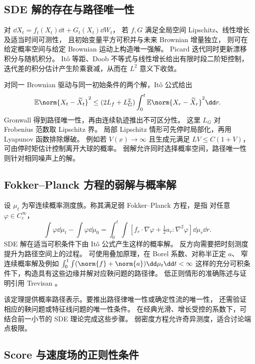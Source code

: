 \subsection{SDE 解的存在与路径唯一性}

对 \(\dd X_t=f_t(X_t)\dd t+G_t(X_t)\dd W_t\)，
若 \(f,G\) 满足全局空间 Lipschitz、线性增长及适当时间可测性，
且初始变量平方可积并与未来 Brownian 增量独立，
则可在给定概率空间与给定 Brownian 运动上构造唯一强解。
Picard 迭代同时更新漂移积分与随机积分。
It\^o 等距、Doob 不等式与线性增长给出有限时段二阶矩控制，
迭代差的积分估计产生阶乘衰减，从而在 \(L^2\) 意义下收敛。

对同一 Brownian 驱动与同一初始条件的两个解，It\^o 公式给出
\[
 \mathbb E\norm{X_t-\widetilde X_t}^2
 \le (2L_f+L_G^2)\int_0^t\mathbb E\norm{X_r-\widetilde X_r}^2\dd r.
\]
Gronwall 得到路径唯一性，再由连续轨迹推出不可区分性。
这里 \(L_G\) 对 Frobenius 范数取 Lipschitz 界。
局部 Lipschitz 情形可先停时局部化，再用 Lyapunov 函数排除爆破。
例如若 \(V(x)\to\infty\) 且生成元满足 \(LV\le C(1+V)\)，
可由停时矩估计控制离开大球的概率。
弱解允许同时选择概率空间，路径唯一性则针对相同噪声上的解。

\subsection{Fokker--Planck 方程的弱解与概率解}

设 \(\mu_t\) 为窄连续概率测度族。称其满足弱 Fokker--Planck 方程，是指
对任意 \(\varphi\in C_c^\infty\)，
\begin{equation}
 \int\varphi\dd\mu_t-\int\varphi\dd\mu_0
 =\int_0^t\int\left[f_r\cdot\nabla\varphi+
                     \tfrac12 a_r:\nabla^2\varphi\right]\dd\mu_r\dd r.
 \label{eq:unified-weak-fp}
\end{equation}
SDE 解在适当可积条件下由 It\^o 公式产生这样的概率解。
反方向需要把时刻测度提升为路径空间上的过程。
可使用叠加原理，在 Borel 系数、对称半正定 \(a\)、
窄连续概率解及例如
\(\int_0^1\int(\norm{f}+\norm{a})\dd\mu_t\dd t<\infty\)
这样的充分可积条件下，构造具有这些边缘并解对应鞅问题的路径律。
低正则情形的准确陈述与证明引用 Trevisan \cite{trevisan2016wellposed}。

该定理提供概率路径表示。要推出路径律唯一性或确定性流的唯一性，
还需验证相应的鞅问题或特征线问题的唯一性条件。
在经典光滑、增长受控的系数下，可结合前一小节的 SDE 理论完成这些步骤。
弱密度方程允许奇异测度，适合讨论端点极限。

\subsection{Score 与速度场的正则性条件}

